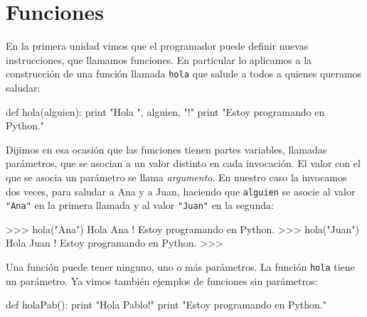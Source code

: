 
%

\chapter[Funciones]{Funciones}

En la primera unidad vimos que el programador puede definir nuevas
instrucciones, que llamamos funciones. En particular lo aplicamos a la
construcción de una función llamada \lstinline+hola+ que salude a todos a
quienes queramos saludar:

\begin{codigo-python-sn}
def hola(alguien):
    print "Hola ", alguien, "!"
    print "Estoy programando en Python."
\end{codigo-python-sn}

Dijimos en esa ocasión que las funciones tienen partes variables, llamadas
parámetros, que se asocian a un valor distinto en cada invocación.  El valor
con el que se asocia un parámetro se llama {\it argumento}.  En nuestro caso la
invocamos dos veces, para saludar a Ana y a Juan, haciendo que
\lstinline+alguien+ se asocie al valor \lstinline!"Ana"! en la primera llamada
y al valor \lstinline!"Juan"! en la segunda:

\begin{codigo-python-sn}
>>> hola("Ana")
Hola Ana !
Estoy programando en Python.
>>> hola("Juan")
Hola Juan !
Estoy programando en Python.
>>>
\end{codigo-python-sn}

Una función puede tener ninguno, uno o más parámetros. La función
\lstinline+hola+ tiene un parámetro. Ya vimos también ejemplos de funciones sin
parámetros:

\begin{codigo-python-sn}
def holaPab():
    print "Hola Pablo!"
    print "Estoy programando en Python."
\end{codigo-python-sn}

